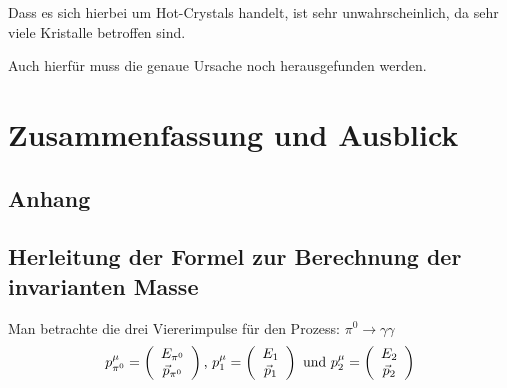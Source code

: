 \documentclass[a4paper,11pt,oneside,final,german,openbib,pdftex]{scrbook}
\begin{document}
{%

Dass es sich hierbei um Hot-Crystals handelt, ist sehr unwahrscheinlich, da sehr viele Kristalle betroffen sind.

Auch hierf\"ur muss die genaue Ursache noch herausgefunden werden.


\chapter{Zusammenfassung und Ausblick}
\label{chap:Zusammenfassung}


\begin{appendix}
\chapter{Anhang}
\section{Herleitung der Formel zur Berechnung der invarianten Masse}
\label{sec:Herleitung-der-Formel-zur-Berechnung-der-invarianten-Masse}

Man betrachte die drei Viererimpulse f\"ur den Prozess: $\pi^0\rightarrow \gamma\gamma $
\begin{equation}
p_{\pi^0}^{\mu}=\left(\begin{array}{c}E_{\pi^0}\\\vec{p}_{\pi^0}\end{array}\right) \textnormal{,  }
p_{1}^{\mu}=\left(\begin{array}{c}E_{1}\\\vec{p}_{1}\end{array}\right) \textnormal{ und  } p_{2}^{\mu}=\left(\begin{array}{c}E_{2}\\\vec{p}_{2}\end{array}\right)
\end{equation}


\end{appendix}}
\end{document}
